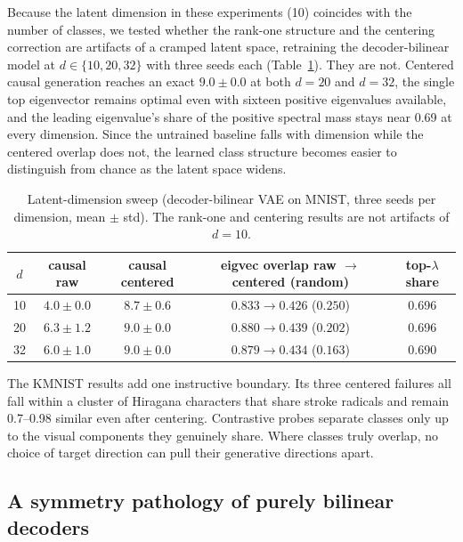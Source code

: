 \documentclass[10pt]{article} %
\begin{document}
Because the latent dimension in these experiments (10) coincides with the number of
classes, we tested whether the rank-one structure and the centering correction are
artifacts of a cramped latent space, retraining the decoder-bilinear model at
$d \in \{10, 20, 32\}$ with three seeds each (Table~\ref{tab:sweep}). They are not.
Centered causal generation reaches an exact $9.0 \pm 0.0$ at both $d = 20$ and
$d = 32$, the single top eigenvector remains optimal even with sixteen positive
eigenvalues available, and the leading eigenvalue's share of the positive spectral
mass stays near 0.69 at every dimension. Since the untrained baseline falls with
dimension while the centered overlap does not, the learned class structure becomes
easier to distinguish from chance as the latent space widens.

\begin{table}[t]
\begin{center}
\begin{tabular}{ccccc}
\toprule
$d$ & causal raw & causal centered & eigvec overlap raw $\to$ centered (random) & top-$\lambda$ share \\
\midrule
10 & $4.0 \pm 0.0$ & $8.7 \pm 0.6$ & $0.833 \to 0.426$ ($0.250$) & 0.696 \\
20 & $6.3 \pm 1.2$ & $\mathbf{9.0 \pm 0.0}$ & $0.880 \to 0.439$ ($0.202$) & 0.696 \\
32 & $6.0 \pm 1.0$ & $\mathbf{9.0 \pm 0.0}$ & $0.879 \to 0.434$ ($0.163$) & 0.690 \\
\bottomrule
\end{tabular}
\end{center}
\caption{Latent-dimension sweep (decoder-bilinear VAE on MNIST, three seeds per
dimension, mean $\pm$ std). The rank-one and centering results are not artifacts of
$d = 10$.}
\label{tab:sweep}
\end{table}

The KMNIST results add one instructive boundary. Its three centered failures all
fall within a cluster of Hiragana characters that share stroke radicals and remain
0.7--0.98 similar even after centering. Contrastive probes separate classes only up
to the visual components they genuinely share. Where classes truly overlap, no
choice of target direction can pull their generative directions apart.

\subsection{A symmetry pathology of purely bilinear decoders}
\label{sec:symmetry}
\end{document}
